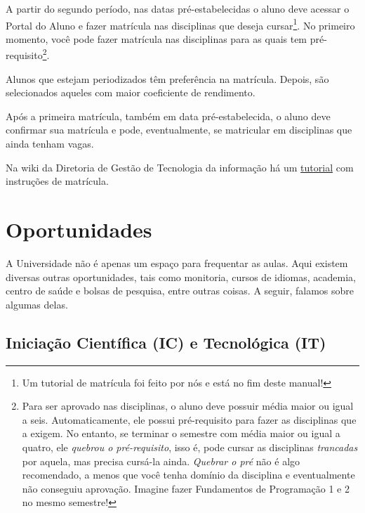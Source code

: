 \documentclass[a4paper,12pt,openany]{article}
\begin{document}
A partir do segundo período, nas datas pré-estabelecidas o aluno deve acessar o Portal do Aluno e fazer matrícula nas disciplinas que deseja cursar\footnote{Um tutorial de matrícula foi feito por nós e está no fim deste manual!}. No primeiro momento, você pode fazer matrícula nas disciplinas para as quais tem pré-requisito\footnote{Para ser aprovado nas disciplinas, o aluno deve possuir média maior ou igual a seis. Automaticamente, ele possui pré-requisito para fazer as disciplinas que a exigem. No entanto, se terminar o semestre com média maior ou igual a quatro, ele \textit{quebrou o pré-requisito}, isso é, pode cursar as disciplinas \textit{trancadas} por aquela, mas precisa cursá-la ainda. \textit{Quebrar o pré} não é algo recomendado, a menos que você tenha domínio da disciplina e eventualmente não conseguiu aprovação. Imagine fazer Fundamentos de Programação 1 e 2 no mesmo semestre!}. 

Alunos que estejam periodizados têm preferência na matrícula. Depois, são selecionados aqueles com maior coeficiente de rendimento.

Após a primeira matrícula, também em data pré-estabelecida, o aluno deve confirmar sua matrícula e pode, eventualmente, se matricular em disciplinas que ainda tenham vagas.


Na wiki da Diretoria de Gestão de Tecnologia da informação há um \href{https://wiki.utfpr.edu.br/doku.php?id=publico:academico:matricula_veteranos}{tutorial} com instruções de matrícula.

\newpage
\section{Oportunidades}

A Universidade não é apenas um espaço para frequentar as aulas. Aqui existem diversas outras oportunidades, tais como monitoria, cursos de idiomas, academia, centro de saúde e bolsas de pesquisa, entre outras coisas. A seguir, falamos sobre algumas delas.

\subsection{Iniciação Científica (IC) e Tecnológica (IT)}
\end{document}
